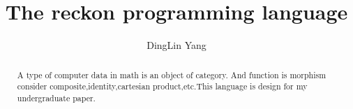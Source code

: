 \documentclass[a4paper,14pt]{article}
\title{The reckon programming language}
\author{DingLin Yang}
\begin{document}
\maketitle
\begin{abstract}
 A type of computer data in math is an object of category.
 And function is morphism consider composite,identity,cartesian product,etc.This language is design for my undergraduate paper.
\end{abstract}
\end{document}
